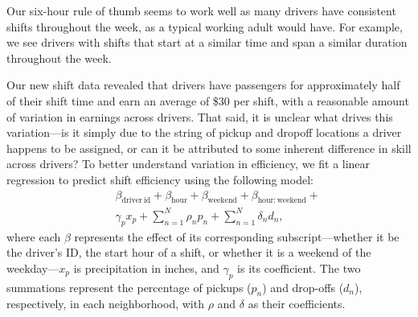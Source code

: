 \documentclass[twocolumn]{article}
\begin{document}
Our six-hour rule of thumb seems to work well as many drivers have consistent shifts throughout the week, as a typical working adult 
would have. For example, we see drivers with shifts that start at a similar time and span a similar duration throughout the week.



Our new shift data revealed that drivers have passengers for approximately half of their shift time and earn an average of \$30 per shift, with a reasonable amount of variation in earnings across drivers.
That said, it is unclear what drives this variation---is it simply due to the string of pickup and dropoff locations a driver happens to be assigned, or can it be attributed to some inherent difference in skill across drivers?
To better understand variation in efficiency, we fit a linear regression to predict shift efficiency using the following model:
\begin{eqnarray*}
&& \beta_{\mathrm{driver~id}} + \beta_{\mathrm{hour}} + \beta_{\mathrm{weekend}} + \beta_{\mathrm{hour:weekend}} + \\
  & & \gamma_p x_p + \sum_{n=1}^N \rho_n p_n + \sum_{n=1}^N \delta_n d_n,
\end{eqnarray*}
where each $\beta$ represents the effect of its corresponding subscript---whether it be the driver's ID, the start hour of a shift, or whether it is a weekend of the weekday---$x_p$ is precipitation in inches, and $\gamma_p$ is its coefficient. The two summations represent the percentage of pickups ($p_n$) and drop-offs ($d_n$), respectively, in each neighborhood, with $\rho$ and $\delta$ as their coefficients.
\end{document}
